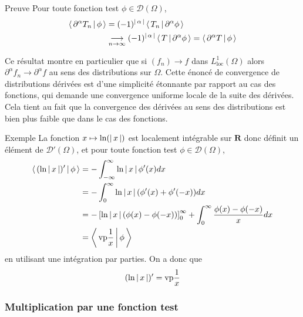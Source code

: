         \begin{demo}{Preuve}
            Pour toute fonction test $\phi \in \mathcal{D}(\Omega)$, 
            \begin{align*}
                \left< \, \partial^{\alpha} T_n \, \middle| \, \phi \, \right>
                &= (-1)^{\left\lvert \, \alpha \, \right\rvert} \left< \, T_n \, \middle| \, \partial^{\alpha} \phi \, \right> \\
                &\underset{n \to \infty}{\longrightarrow} (-1)^{\left\lvert \, \alpha \, \right\rvert} \left< \, T \, \middle| \, \partial^{\alpha} \phi \, \right> = \left< \, \partial^{\alpha} T \, \middle| \, \phi \, \right>
            \end{align*}
        \end{demo}

        Ce résultat montre en particulier que si $(f_n) \to f$ dans $L^1_{\text{loc}}(\Omega)$ alors $\partial^{\alpha} f_n \to \partial^{\alpha} f$ au sens des distributions sur $\Omega$. Cette énoncé de convergence de distributions dérivées est d’une simplicité étonnante par rapport au cas des fonctions, qui demande une convergence uniforme locale de la suite des dérivées. Cela tient au fait que la convergence des dérivées au sens des distributions est bien plus faible que dans le cas des fonctions.

        \begin{demo}{Exemple}
            La fonction $x \mapsto \ln(\left\lvert \, x \, \right\rvert)$ est localement intégrable sur $\mathbf{R}$ donc définit un élément de $\mathcal{D}'(\Omega)$, et pour toute fonction test $\phi \in \mathcal{D}(\Omega)$,
            \begin{align*}
                \left< \, (\ln\left\lvert \, x \, \right\rvert)' \, \middle| \, \phi \, \right> 
                &= - \int_{-\infty}^{\infty} \ln\left\lvert \, x \, \right\rvert \phi'(x) dx \\
                &= - \int_{0}^{\infty} \ln\left\lvert \, x \, \right\rvert(\phi'(x) + \phi'(-x))dx \\
                &= - \left[\ln\left\lvert \, x \, \right\rvert(\phi(x) - \phi(-x))\right]_0^{\infty} + \int_{0}^{\infty} \frac{\phi(x) - \phi(-x)}{x} dx \\
                &= \left< \, \text{vp}\frac{1}{x} \, \middle| \, \phi \, \right>
            \end{align*}
            en utilisant une intégration par parties. On a donc que 
            \[ (\ln\left\lvert \, x \, \right\rvert)' = \text{vp}\frac{1}{x} \]   
        \end{demo}

        \subsubsection{Multiplication par une fonction test}

